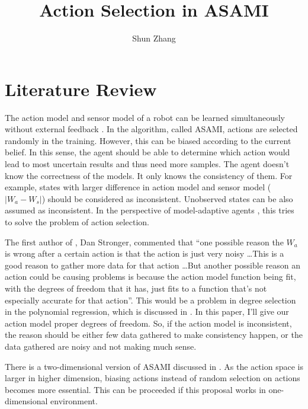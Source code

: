 \documentclass[10pt]{article}
\title{Action Selection in ASAMI}
\author{Shun Zhang}
\date{}
\begin{document}
\maketitle


\sloppy
\section{Literature Review}

The action model and sensor model of a robot can be learned
simultaneously without external feedback \cite{CSJ06}.  In the
algorithm, called ASAMI, actions are selected randomly in the
training. However, this can be biased according to the current belief.
In this sense, the agent should be able to determine which action
would lead to most uncertain results and thus need more samples.  The
agent doesn't know the correctness of the models. It only knows the
consistency of them. For example, states with larger difference in
action model and sensor model ($|W_a - W_s|$) should be considered as
inconsistent.  Unobserved states can be also assumed as inconsistent.
In the perspective of model-adaptive agents \cite{maes1993modeling},
this tries to solve the problem of action selection.

The first author of \cite{CSJ06}, Dan Stronger, commented that ``one
possible reason the $W_a$ is wrong after a certain action is that the
action is just very noisy \ldots This is a good reason to gather more
data for that action \ldots  But another possible reason  an action
could be causing problems is because the action model function being
fit, with the degrees of freedom that it has, just fits to a function
that's not especially accurate for that action''. This would be a
problem in degree selection in the polynomial regression, which is
discussed in \cite{IJAIT08-stronger}. In this paper, I'll give our
action model proper degrees of freedom. So, if the action model is
inconsistent, the reason should be either few data gathered to make
consistency happen, or the data gathered are noisy and not making much
sense.

There is a two-dimensional version of ASAMI discussed in
\cite{ICRA08-stronger}.  As the action space is larger in higher
dimension, biasing actions instead of random selection on actions
becomes more essential. This can be proceeded if this proposal works
in one-dimensional environment.
\end{document}
